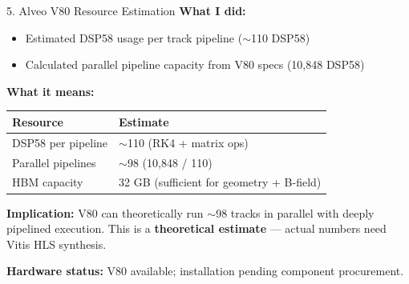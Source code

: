 \documentclass[aspectratio=169, table]{beamer}
\begin{document}
\begin{frame}{5. Alveo V80 Resource Estimation}
\textbf{What I did:}
\begin{itemize}
    \item Estimated DSP58 usage per track pipeline ($\sim$110 DSP58)
    \item Calculated parallel pipeline capacity from V80 specs (10,848 DSP58)
\end{itemize}

\vspace{0.5em}
\textbf{What it means:}
\begin{table}
\small
\begin{tabular}{ll}
    \toprule
    \textbf{Resource} & \textbf{Estimate} \\
    \midrule
    DSP58 per pipeline & $\sim$110 (RK4 + matrix ops) \\
    Parallel pipelines & $\sim$98 (10,848 / 110) \\
    HBM capacity & 32 GB (sufficient for geometry + B-field) \\
    \bottomrule
\end{tabular}
\end{table}

\textbf{Implication:} V80 can theoretically run $\sim$98 tracks in parallel with deeply pipelined execution. This is a \textbf{theoretical estimate} --- actual numbers need Vitis HLS synthesis.

\vspace{0.3em}
\textbf{Hardware status:} V80 available; installation pending component procurement.
\end{frame}
\end{document}
